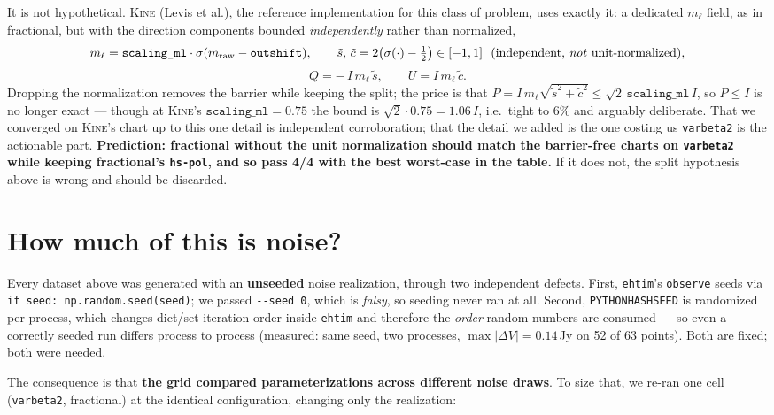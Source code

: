 \documentclass[11pt]{article}
\begin{document}
It is not hypothetical. \textsc{Kine} (Levis et al.), the reference implementation for
this class of problem, uses exactly it: a dedicated $m_\ell$ field, as in fractional, but
with the direction components bounded \emph{independently} rather than normalized,
\begin{equation}
  m_\ell = \texttt{scaling\_ml}\cdot\sigma(m_{\mathrm{raw}}-\texttt{outshift}),
  \qquad
  \tilde{s},\,\tilde{c} = 2\big(\sigma(\cdot)-\tfrac12\big) \in [-1,1]
  \ \ \text{(independent, \emph{not} unit-normalized)},
\end{equation}
\begin{equation}
  Q = -\,I\,m_\ell\,\tilde{s}, \qquad U = I\,m_\ell\,\tilde{c}.
\end{equation}
Dropping the normalization removes the barrier while keeping the split; the price is that
$P = I\,m_\ell\sqrt{\tilde{s}^2+\tilde{c}^2} \le \sqrt2\,\texttt{scaling\_ml}\,I$, so
$P\le I$ is no longer exact --- though at \textsc{Kine}'s $\texttt{scaling\_ml}=0.75$ the
bound is $\sqrt2\cdot0.75 = 1.06\,I$, i.e.\ tight to $6\%$ and arguably deliberate. That
we converged on \textsc{Kine}'s chart up to this one detail is independent corroboration;
that the detail we added is the one costing us \texttt{varbeta2} is the actionable part.
\textbf{Prediction: fractional without the unit normalization should match the
barrier-free charts on \texttt{varbeta2} while keeping fractional's \texttt{hs-pol}, and
so pass 4/4 with the best worst-case in the table.} If it does not, the split hypothesis
above is wrong and should be discarded.

\section{How much of this is noise?}
\label{sec:noise}

Every dataset above was generated with an \textbf{unseeded} noise realization, through
two independent defects. First, \texttt{ehtim}'s \texttt{observe} seeds via
\texttt{if seed: np.random.seed(seed)}; we passed \texttt{-{}-seed 0}, which is
\emph{falsy}, so seeding never ran at all. Second, \texttt{PYTHONHASHSEED} is
randomized per process, which changes dict/set iteration order inside \texttt{ehtim}
and therefore the \emph{order} random numbers are consumed --- so even a correctly
seeded run differs process to process (measured: same seed, two processes, $\max|\Delta
V| = 0.14$\,Jy on 52 of 63 points). Both are fixed; both were needed.

The consequence is that \textbf{the grid compared parameterizations across different
noise draws}. To size that, we re-ran one cell (\texttt{varbeta2}, fractional) at the
identical configuration, changing only the realization:
\end{document}
